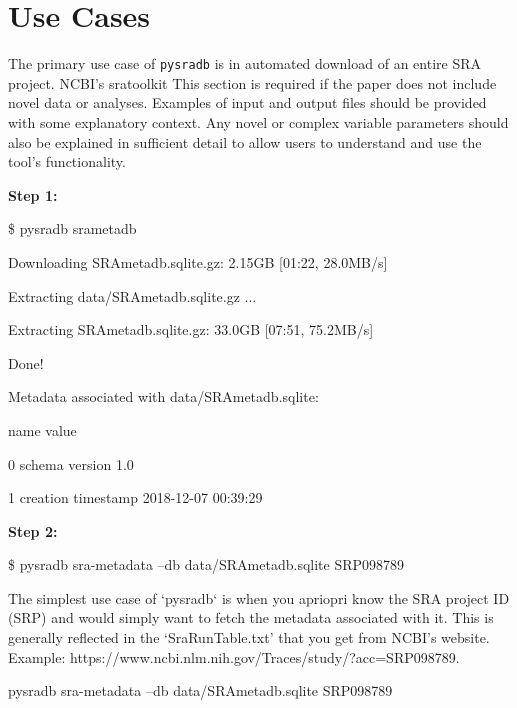 \documentclass[9pt,a4paper]{extarticle}
\newenvironment{allintypewriter}{\ttfamily}{\par}
\begin{document}
\section*{Use Cases} %
The primary use case of \texttt{pysradb} is in automated download of an entire
SRA project. NCBI's sratoolkit \cite{ncbisratoolit}
This section is required if the paper does not include novel data or analyses. 
Examples of input and output files should be provided with some explanatory context.  Any novel or complex variable parameters should also be explained in sufficient detail to allow users to understand and use the tool's functionality.


\textbf{Step 1: }

\begin{allintypewriter}
\$ pysradb srametadb

Downloading SRAmetadb.sqlite.gz: 2.15GB [01:22, 28.0MB/s]   

Extracting data/SRAmetadb.sqlite.gz ...

Extracting SRAmetadb.sqlite.gz: 33.0GB [07:51, 75.2MB/s]

Done!

Metadata associated with data/SRAmetadb.sqlite:

                 name                value

0      schema version                  1.0

1  creation timestamp  2018-12-07 00:39:29

\end{allintypewriter}

\textbf{Step 2:}

\begin{allintypewriter}
\$ pysradb sra-metadata --db data/SRAmetadb.sqlite SRP098789 


\end{allintypewriter}

The simplest use case of `pysradb` is when you apriopri know the SRA project ID (SRP)
and would simply want to fetch the metadata associated with it. This is generally
reflected in the `SraRunTable.txt' that you get from NCBI's website.
Example: https://www.ncbi.nlm.nih.gov/Traces/study/?acc=SRP098789.


\begin{allintypewriter}
pysradb sra-metadata --db data/SRAmetadb.sqlite SRP098789
\end{allintypewriter}
\end{document}
